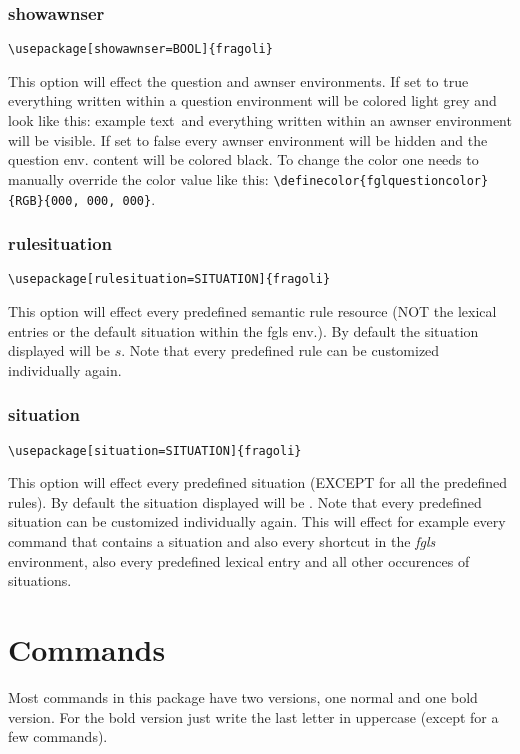 \documentclass[10pt, a4paper]{article}
\begin{document}
	\subsubsection{showawnser}
	\begin{lstlisting}[style=A]
	\usepackage[showawnser=BOOL]{fragoli}
	\end{lstlisting}
	This option will effect the question and awnser environments. If set to true everything written within a question environment will be colored light grey and look like this: \color{fglquestioncolor}example text\color{black}\ and everything written within an awnser environment will be visible. If set to false every awnser environment will be hidden and the question env. content will be colored black. To change the color one needs to manually override the color value like this: \verb=\definecolor{fglquestioncolor}{RGB}{000, 000, 000}=.
	\subsubsection{rulesituation}
	\begin{lstlisting}[style=A]
	\usepackage[rulesituation=SITUATION]{fragoli}
	\end{lstlisting}
	This option will effect every predefined semantic rule resource (NOT the lexical entries or the default situation within the fgls env.). By default the situation displayed will be $s$. Note that every predefined rule can be customized individually again.
	\subsubsection{situation}
	\begin{lstlisting}[style=A]
	\usepackage[situation=SITUATION]{fragoli}
	\end{lstlisting}
	This option will effect every predefined situation (EXCEPT for all the predefined rules). By default the situation displayed will be \sstar. Note that every predefined situation can be customized individually again. This will effect for example every command that contains a situation and also every shortcut in the \textit{fgls} environment, also every predefined lexical entry and all other occurences of situations.
	\section{Commands}
	Most commands in this package have two versions, one normal and one bold version. For the bold version just write the last letter in uppercase (except for a few commands).
\end{document}
